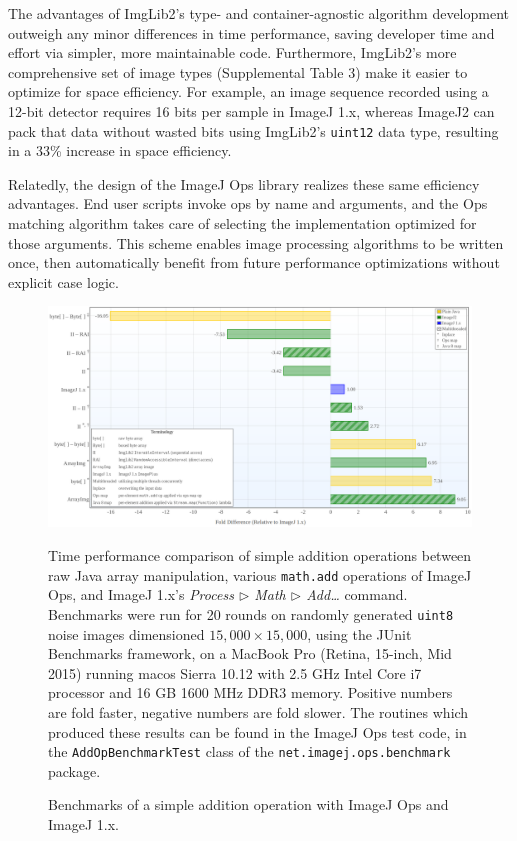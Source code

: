 \documentclass{bmcart}
\begin{document}
The advantages of ImgLib2's type- and container-agnostic algorithm development
outweigh any minor differences in time performance, saving developer time and
effort via simpler, more maintainable code. Furthermore, ImgLib2's more
comprehensive set of image types (Supplemental Table 3) make it easier to
optimize for space efficiency. For example, an image sequence recorded using a
12-bit detector requires 16 bits per sample in ImageJ 1.x, whereas ImageJ2 can
pack that data without wasted bits using ImgLib2's \texttt{uint12} data type,
resulting in a 33\% increase in space efficiency.

Relatedly, the design of the ImageJ Ops library realizes these same efficiency
advantages. End user scripts invoke ops by name and arguments, and the Ops
matching algorithm takes care of selecting the implementation optimized for
those arguments. This scheme enables image processing algorithms to be written
once, then automatically benefit from future performance optimizations without
explicit case logic.

  \begin{figure}[h]
    \caption{Benchmarks of a simple addition operation with ImageJ Ops and
    ImageJ 1.x.}
    \includegraphics[width=4.75in,natwidth=1836,natheight=959]{figure-6/figure.png}
    \begin{flushleft}
      \footnotesize
      Time performance comparison of simple addition operations between raw
      Java array manipulation, various \texttt{math.add} operations of ImageJ
      Ops, and ImageJ 1.x's \textit{Process $\triangleright$ Math
      $\triangleright$ Add\ldots} command. Benchmarks were run for 20 rounds on
      randomly generated \texttt{uint8} noise images dimensioned $15,000 \times
      15,000$, using the JUnit Benchmarks framework, on a MacBook Pro (Retina,
      15-inch, Mid 2015) running \acrshort{macos} Sierra 10.12 with 2.5 GHz
      Intel Core i7 processor and 16 GB 1600 MHz DDR3 memory. Positive numbers
      are fold faster, negative numbers are fold slower. The routines which
      produced these results can be found in the ImageJ Ops test code, in the
      \texttt{AddOpBenchmarkTest} class of the
      \texttt{net.imagej.ops.benchmark} package.
    \end{flushleft}
  \end{figure}
\end{document}
